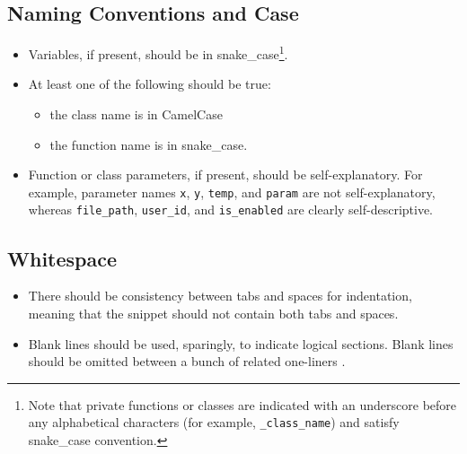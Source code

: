\documentclass[11pt]{article}
\begin{document}
\subsection{Naming Conventions and Case }

\begin{itemize}

    \item Variables, if present, should be in snake\_case\footnote{Note that private functions or classes are indicated with an underscore before any alphabetical characters (for example, \texttt{\_class\_name}) and satisfy snake\_case convention.}.

    \item At least one of the following should be true:

    \vspace{-2.5mm}
    
    \begin{itemize}[label=\textopenbullet]

        \item the class name is in CamelCase
        \item the function name is in snake\_case.
        
    \end{itemize}

    \vspace{-2.5mm}
   
    \item Function or class parameters, if present, should be self-explanatory. For example, parameter names \texttt{x}, \texttt{y}, \texttt{temp}, and \texttt{param} are not self-explanatory, whereas \texttt{file\_path}, \texttt{user\_id}, and \texttt{is\_enabled} are clearly self-descriptive.

\end{itemize}


\subsection{Whitespace}\label{sec:whitespace}

\begin{itemize}

    \item There should be consistency between tabs and spaces for indentation, meaning that the snippet should not contain both tabs and spaces.

    \item Blank lines should be used, sparingly, to indicate logical sections. Blank lines should be omitted between a bunch of related one-liners \cite{pep8_blank_lines}.
    
\end{itemize}
\end{document}
